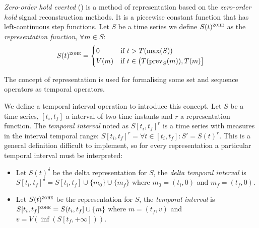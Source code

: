 \begin{definition}
  \emph{Zero-order hold everted} (\zohe{}) is a method of
  representation based on the \emph{zero-order hold} signal
  reconstruction methods. It is a piecewise constant function that has
  left-continuous step functions.  Let $S$ be a time series we define
  $S(t)^\zohe$ as the \emph{\zohe{} representation function}, $\forall
  m \in S:$
\[
    S(t)^\zohe 
    = \begin{cases}
      0 & \text{if }  t > T(\max(S)) \\
      V(m) & \text{if } t\in \big(T(\prev_S(m)),T(m)\big]
    \end{cases}
\]
\end{definition}




The concept of representation is used for formalising some set and
sequence operators as temporal operators. 



We define a temporal interval operation to introduce this
concept.
Let $S$ be a time series, $[t_i,t_f]$ a interval of two time instants
and $r$ a representation function. The \emph{temporal interval} noted
as $S[t_i,t_f]^r$ is a time series with measures in the interval
temporal range: $S[t_i,t_f]^r= \forall t \in [t_i,t_f] : S' = S(t)^r
$. This is a general definition difficult to implement, so for every
representation a particular temporal interval must be interpreted:

\begin{itemize}
\item Let $S(t)^\delta$ be the delta representation for $S$, the
  \emph{delta temporal interval} is $S[t_i,t_f]^\delta = S[t_i,t_f]
  \cup \{m_0\} \cup \{m_f\}$ where $m_0=(t_i,0)$ and $m_f=(t_f,0)$.

\item Let $S(t)^\zohe{}$ be the \zohe{} representation for $S$, the
  \emph{\zohe{} temporal interval} is $S[t_i,t_f]^\zohe{} = S(t_i,t_f]
  \cup \{m\}$ where $m=(t_f,v)$ and $v= V(\inf( S[t_f,+\infty] ))$.
\end{itemize}



